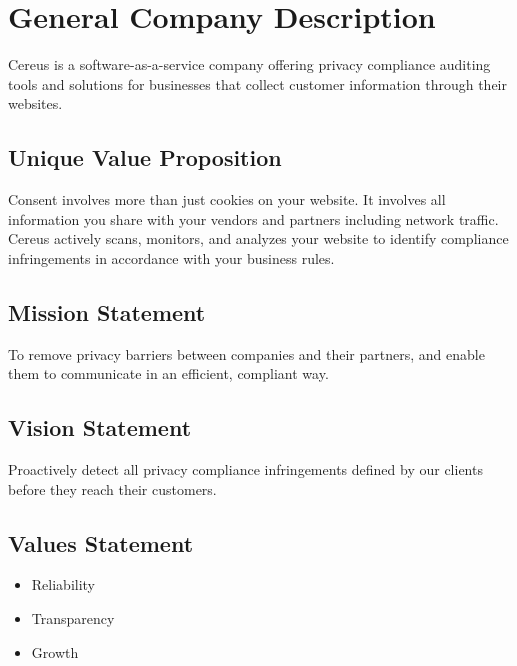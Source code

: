 {\let\cleardoublepage\relax \chapter{General Company Description}}

Cereus is a software-as-a-service company offering privacy compliance auditing tools and solutions for businesses that collect customer information through their websites.

{\let\clearpage\relax \section{Unique Value Proposition}}

Consent involves more than just cookies on your website. It involves all information you share with your vendors and partners including network traffic. Cereus actively scans, monitors, and analyzes your website to identify compliance infringements in accordance with your business rules.

{\let\clearpage\relax \section{Mission Statement}}

To remove privacy barriers between companies and their partners, and enable them to communicate in an efficient, compliant way.


\section{Vision Statement}

Proactively detect all privacy compliance infringements defined by our clients before they reach their customers. 

\section{Values Statement}

\begin{itemize}
  \item Reliability
  \item Transparency
  \item Growth
\end{itemize}

